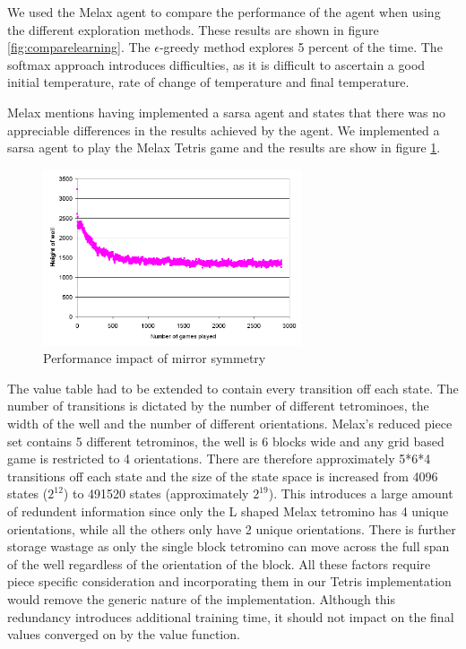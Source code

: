 \documentclass{rucsthesis}
\begin{document}
We used the Melax agent to compare the performance of the agent when using the different exploration methods. These results are shown in figure \ref{fig:comparelearning}. The $\epsilon$-greedy method explores 5 percent of the time. The softmax approach introduces difficulties, as it is difficult to ascertain a good initial temperature, rate of change of temperature and final temperature.

Melax mentions having implemented a sarsa agent and states that there was no appreciable differences in the results achieved by the agent. We implemented a sarsa agent to play the Melax Tetris game and the results are show in figure \ref{fig:melaxsarsa}.

\begin{figure}[h]
\centering
\includegraphics[width=3in]{sarsamelax.png}
\caption{Performance impact of mirror symmetry}
\label{fig:melaxsarsa}
\end{figure} 

The value table had to be extended to contain every transition off each state. The number of transitions is dictated by the number of different tetrominoes, the width of the well and the number of different orientations. Melax's reduced piece set contains 5 different tetrominos, the well is 6 blocks wide and any grid based game is restricted to 4 orientations. There are therefore approximately 5*6*4 transitions off each state and the size of the state space is increased from 4096 states ($2^{12}$) to 491520 states (approximately $2^{19}$). This introduces a large amount of redundent information since only the L shaped Melax tetromino has 4 unique orientations, while all the others only have 2 unique orientations. There is further storage wastage as only the single block tetromino can move across the full span of the well regardless of the orientation of the block. All these factors require piece specific consideration and incorporating them in our Tetris implementation would remove the generic nature of the implementation. Although this redundancy introduces additional training time, it should not impact on the final values converged on by the value function.
\end{document}
